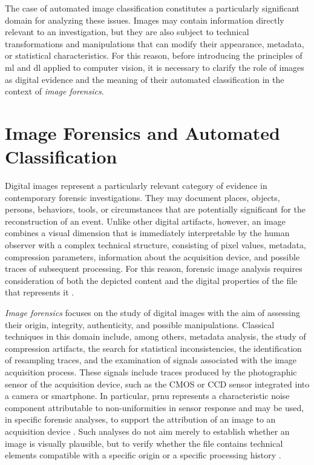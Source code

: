The case of automated image classification constitutes a particularly
significant domain for analyzing these issues. Images may contain information
directly relevant to an investigation, but they are also subject to technical
transformations and manipulations that can modify their appearance, metadata,
or statistical characteristics. For this reason, before introducing the
principles of \gls{ml} and \gls{dl} applied to computer vision, it is necessary
to clarify the role of images as digital evidence and the meaning of their
automated classification in the context of \textit{image forensics}.


\section{Image Forensics and Automated Classification}
\label{sec:background_image_forensics}
Digital images represent a particularly relevant category of evidence in
contemporary forensic investigations. They may document places, objects,
persons, behaviors, tools, or circumstances that are potentially significant
for the reconstruction of an event. Unlike other digital artifacts, however,
an image combines a visual dimension that is immediately interpretable by the
human observer with a complex technical structure, consisting of pixel values,
metadata, compression parameters, information about the acquisition device, and
possible traces of subsequent processing. For this reason, forensic image
analysis requires consideration of both the depicted content and the digital
properties of the file that represents it \cite{farid2016photo,stamm2013information}.

\textit{Image forensics} focuses on the study of digital images with the aim of
assessing their origin, integrity, authenticity, and possible manipulations.
Classical techniques in this domain include, among others, metadata analysis,
the study of compression artifacts, the search for statistical inconsistencies,
the identification of resampling traces, and the examination of signals
associated with the image acquisition process. These signals include traces
produced by the photographic sensor of the acquisition device, such as the CMOS
or CCD sensor integrated into a camera or smartphone. In particular, \gls{prnu}
represents a characteristic noise component attributable to non-uniformities in
sensor response and may be used, in specific forensic analyses, to support the
attribution of an image to an acquisition device \cite{lukas2006prnu}. Such
analyses do not aim merely to establish whether an image is visually plausible,
but to verify whether the file contains technical elements compatible with a
specific origin or a specific processing history
\cite{popescu2005exposing,farid2016photo}.

